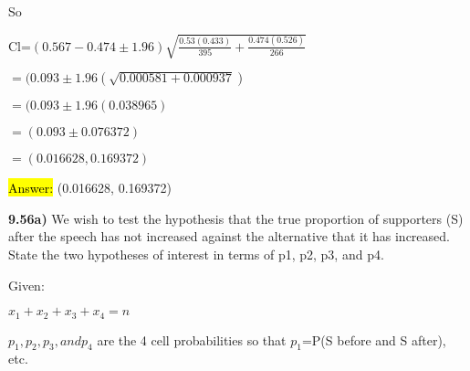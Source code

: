 \documentclass{article}
\begin{document}
 \vspace{2mm}
 
 So
 
 \vspace{2mm}
 
 Cl=$(0.567-0.474 \pm 1.96){\sqrt{\frac{0.53(0.433)}{395}+\frac{0.474(0.526)}{266}}}$
 
 $=(0.093 \pm 1.96(\sqrt{0.000581+0.000937})$
 
 $=(0.093 \pm 1.96(0.038965)$
 
 $=(0.093 \pm 0.076372)$
 
 $=(0.016628, 0.169372)$
 
 \vspace{2mm}


\hl{Answer:} (0.016628, 0.169372)
 
 
 
 
 
 
 
 
 
 





\newpage

\textbf{9.56a)} We wish to test the hypothesis that the true proportion of supporters (S) after the speech has not increased against the alternative that it has increased. State the two hypotheses of interest in terms of p1, p2, p3, and p4. 

\vspace{3mm}

Given:

$x_{1}+x_{2}+x_{3}+x_{4} =n$

\vspace{3mm}
 
$p_{1}, p_{2}, p_{3}, and p_{4}$ are the 4 cell probabilities so that $p_{1}$=P(S before and S after), etc. 
\end{document}
